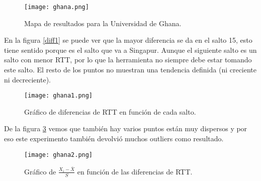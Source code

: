 \begin{figure}[H]
\texttt{[image: ghana.png]}
\caption{Mapa de resultados para la Universidad de Ghana.}
\label{mapa2}
\end{figure}

En la figura \ref{diff1} se puede ver que la mayor diferencia se da en el salto 15, esto tiene sentido porque es el salto que va a Singapur. Aunque el siguiente salto es un salto con menor RTT, por lo que la herramienta no siempre debe estar tomando este salto. El resto de los puntos no muestran una tendencia definida (ni creciente ni decreciente).


\begin{figure}[H]
\centering
\texttt{[image: ghana1.png]}
\caption{Gráfico de diferencias de RTT en función de cada salto.}
\label{diff2}
\end{figure}

De la figura \ref{sdev2} vemos que también hay varios puntos están muy dispersos y por eso este experimento también devolvió muchos outliers como resultado.

\begin{figure}[H]
\centering
\texttt{[image: ghana2.png]}
\caption{Gráfico de $\frac{X_i - \bar{X}}{S}$ en función de las diferencias de RTT.}
\label{sdev2}
\end{figure}